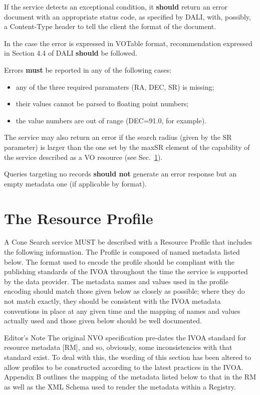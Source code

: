 \documentclass[11pt,a4paper]{ivoa}
\begin{document}
If the service detects an exceptional condition, it \textbf{should} return
an error document with an appropriate status code, as specified by DALI,
with, possibly, a Content-Type header to tell the client the format of
the document.

In the case the error is expressed in VOTable format, recommendation
expressed in Section 4.4 of DALI \textbf{should} be followed.

Errors \textbf{must} be reported in any of the following cases:
\begin{itemize}
	\item any of the three required paramaters (RA, DEC, SR) is missing;
	\item	their values cannot be parsed to floating point numbers;
	\item the value numbers are out of range (DEC=91.0, for example).
\end{itemize}

The service may also return an error if the search radius (given by the
SR parameter) is larger than the one set by the maxSR element of the
capability of the service described as a VO resource (see
Sec.~\ref{sec:3}).

Queries targeting no records \textbf{should not} generate an error
response but an empty metadata one (if applicable by format).

\section{The Resource Profile}
\label{sec:3} 

A Cone Search service MUST
be described with a Resource Profile that includes the following
information. The Profile is composed of named metadata listed below. The
format used to encode the profile should be compliant with the
publishing standards of the IVOA throughout the time the service is
supported by the data provider. The metadata names and values used in
the profile encoding should match those given below as closely as
possible; where they do not match exactly, they should be consistent
with the IVOA metadata conventions in place at any given time and the
mapping of names and values actually used and those given below should
be well documented.

\begin{bigdescription}
	\item[Editor's Note] 
		The original NVO specification pre-dates the IVOA standard for resource
		metadata [RM], and so, obviously, some inconsistencies with that
		standard exist. To deal with this, the wording of this section has been
		altered to allow profiles to be constructed according to the latest
		practices in the IVOA. Appendix B outlines the mapping of the metadata
		listed below to that in the RM as well as the XML Schema used to render
		the metadata within a Registry.
\end{bigdescription}
\end{document}
